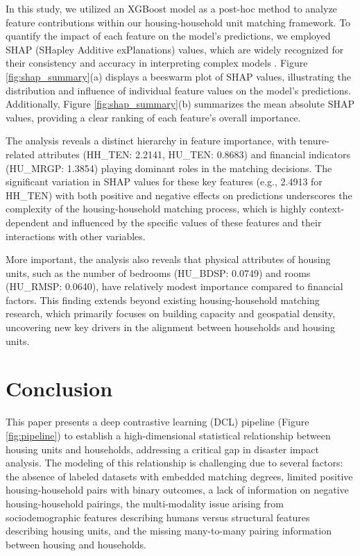 \documentclass[]{nature_mod}
\begin{document}
In this study, we utilized an XGBoost model as a post-hoc method to analyze feature contributions within our housing-household unit matching framework. To quantify the impact of each feature on the model's predictions, we employed SHAP (SHapley Additive exPlanations) values, which are widely recognized for their consistency and accuracy in interpreting complex models \cite{lundberg2018consistent}. Figure \ref{fig:shap_summary}(a) displays a beeswarm plot of SHAP values, illustrating the distribution and influence of individual feature values on the model’s predictions. Additionally, Figure \ref{fig:shap_summary}(b) summarizes the mean absolute SHAP values, providing a clear ranking of each feature’s overall importance.

The analysis reveals a distinct hierarchy in feature importance, with tenure-related attributes (HH\_TEN: 2.2141, HU\_TEN: 0.8683) and financial indicators (HU\_MRGP: 1.3854) playing dominant roles in the matching decisions. The significant variation in SHAP values for these key features (e.g., 2.4913 for HH\_TEN) with both positive and negative effects on predictions underscores the complexity of the housing-household matching process, which is highly context-dependent and influenced by the specific values of these features and their interactions with other variables.

More important, the analysis also reveals that physical attributes of housing units, such as the number of bedrooms (HU\_BDSP: 0.0749) and rooms (HU\_RMSP: 0.0640), have relatively modest importance compared to financial factors. This finding extends beyond existing housing-household matching research, which primarily focuses on building capacity and geospatial density, uncovering new key drivers in the alignment between households and housing units.


\section{Conclusion}
This paper presents a deep contrastive learning (DCL) pipeline (Figure \ref{fig:pipeline}) to establish a high-dimensional statistical relationship between housing units and households, addressing a critical gap in disaster impact analysis. The modeling of this relationship is challenging due to several factors: the absence of labeled datasets with embedded matching degrees, limited positive housing-household pairs with binary outcomes, a lack of information on negative housing-household pairings, the multi-modality issue arising from sociodemographic features describing humans versus structural features describing housing units, and the missing many-to-many pairing information between housing and households.
\end{document}
